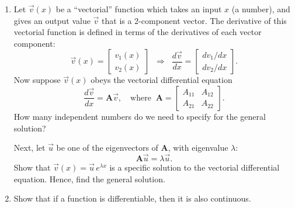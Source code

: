 \documentclass[10pt,a4paper]{article}
\begin{document}
\begin{enumerate}
\item
  Let $\vec{v}(x)$ be a ``vectorial'' function which takes an input
  $x$ (a number), and gives an output value $\vec{v}$ that is a
  2-component vector. The derivative of this vectorial function is
  defined in terms of the derivatives of each vector component:
\begin{equation}
\vec{v}(x) = \begin{bmatrix}v_1(x) \\ v_2(x)\end{bmatrix} \;\; \Rightarrow \;\; \frac{d\vec{v}}{dx} = \begin{bmatrix}dv_1/dx \\ dv_2/dx\end{bmatrix}.
\end{equation}
Now suppose $\vec{v}(x)$ obeys the vectorial differential equation
\begin{equation}
\frac{d\vec{v}}{dx} = \mathbf{A} \vec{v}, \quad\mathrm{where}\;\;\mathbf{A} = \begin{bmatrix}A_{11} & A_{12} \\ A_{21} & A_{22}\end{bmatrix}.
\end{equation}
How many independent numbers do we need to specify for the general
solution?

Next, let $\vec{u}$ be one of the eigenvectors of $\mathbf{A}$, with
eigenvalue $\lambda$:
\begin{equation}
\mathbf{A} \vec{u} = \lambda \vec{u}.
\end{equation}
Show that $\vec{v}(x) = \vec{u}\, e^{\lambda x}$ is a specific
solution to the vectorial differential equation. Hence, find the general
solution.

\item
  Show that if a function is differentiable, then it is also
  continuous.
\end{enumerate}
\end{document}
